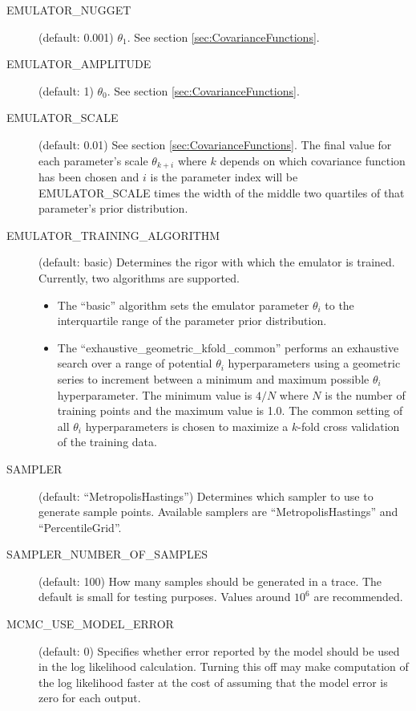 \begin{description}
    \item[EMULATOR\_NUGGET] (default: 0.001) $\theta_1$. See section \ref{sec:CovarianceFunctions}.

    \item[EMULATOR\_AMPLITUDE] (default: 1) $\theta_0$. See section \ref{sec:CovarianceFunctions}.

    \item[EMULATOR\_SCALE] (default: 0.01) See section \ref{sec:CovarianceFunctions}. The final value for each parameter's scale $\theta_{k+i}$ where $k$ depends on which covariance function has been chosen and $i$ is the parameter index will be EMULATOR\_SCALE times the width of the middle two quartiles of that parameter's prior distribution.

    \item[EMULATOR\_TRAINING\_ALGORITHM] (default: basic) Determines the rigor with which the emulator is trained. Currently, two algorithms are supported.

    \begin{itemize}

      \item The ``basic'' algorithm sets the emulator parameter $\theta_i$ to the interquartile range of the parameter prior distribution.

      \item The ``exhaustive_geometric_kfold_common'' performs an exhaustive search over a range of potential $\theta_i$ hyperparameters using a geometric series to increment between a minimum and maximum possible $\theta_i$ hyperparameter. The minimum value is $4 / N$ where $N$ is the number of training points and the maximum value is 1.0. The common setting of all $\theta_i$ hyperparameters is chosen to maximize a $k$-fold cross validation of the training data.

    \end{itemize}

    \item[SAMPLER] (default: ``MetropolisHastings'') Determines which sampler to use to generate sample points. Available samplers are ``MetropolisHastings'' and ``PercentileGrid''.

    \item[SAMPLER\_NUMBER\_OF\_SAMPLES] (default: 100) How many samples should be generated in a trace. The default is small for testing purposes. Values around $10^6$ are recommended.

    \item[MCMC\_USE\_MODEL\_ERROR] (default: 0) Specifies whether error reported by the model should be used in the log likelihood calculation. Turning this off may make computation of the log likelihood faster at the cost of assuming that the model error is zero for each output.


\end{description}
